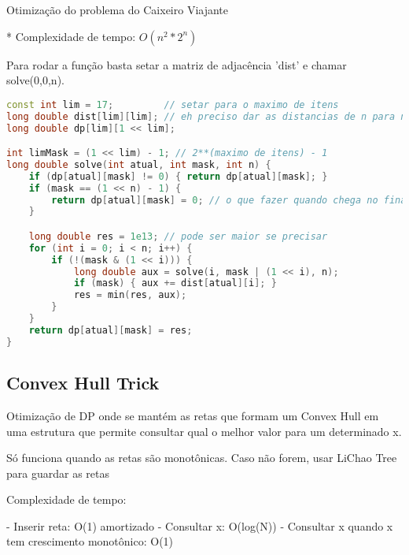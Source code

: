 \documentclass[11pt, a4paper, twoside]{article}
\begin{document}
Otimização do problema do Caixeiro Viajante

* Complexidade de tempo: $O(n^2 * 2^n)$

Para rodar a função basta setar a matriz de adjacência 'dist' e chamar solve(0,0,n).

\begin{lstlisting}[language=C++]
const int lim = 17;         // setar para o maximo de itens
long double dist[lim][lim]; // eh preciso dar as distancias de n para n
long double dp[lim][1 << lim];

int limMask = (1 << lim) - 1; // 2**(maximo de itens) - 1
long double solve(int atual, int mask, int n) {
    if (dp[atual][mask] != 0) { return dp[atual][mask]; }
    if (mask == (1 << n) - 1) {
        return dp[atual][mask] = 0; // o que fazer quando chega no final
    }

    long double res = 1e13; // pode ser maior se precisar
    for (int i = 0; i < n; i++) {
        if (!(mask & (1 << i))) {
            long double aux = solve(i, mask | (1 << i), n);
            if (mask) { aux += dist[atual][i]; }
            res = min(res, aux);
        }
    }
    return dp[atual][mask] = res;
}
\end{lstlisting}

\subsection{Convex Hull Trick}


Otimização de DP onde se mantém as retas que formam um Convex Hull em uma estrutura que permite consultar qual o melhor valor para um determinado x.

Só funciona quando as retas são monotônicas. Caso não forem, usar LiChao Tree para guardar as retas

Complexidade de tempo:

- Inserir reta: O(1) amortizado
- Consultar x: O(log(N))
- Consultar x quando x tem crescimento monotônico: O(1)
\end{document}
